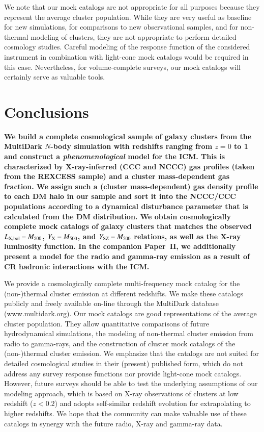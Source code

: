 \documentclass[useAMS,usenatbib]{mn2e}
\begin{document}
{We note that our mock catalogs are not appropriate for all purposes because they
represent the average cluster population. While they are very useful as baseline
for new simulations, for comparisons to new observational samples, and for
non-thermal modeling of clusters, they are not appropriate to perform detailed
cosmology studies. Careful modeling of the response function of the considered
instrument in combination with light-cone mock catalogs would be required in this
case. Nevertheless, for volume-complete surveys, our mock catalogs will
certainly serve as valuable tools.  }


\section{Conclusions}
\label{sec:7}

{\bf We build a complete cosmological sample of galaxy clusters from the
  MultiDark $N$-body simulation with redshifts ranging from $z = 0$ to 1 and
  construct a \emph{phenomenological} model for the ICM. This is characterized
  by X-ray-inferred (CCC and NCCC) gas profiles (taken from the REXCESS sample)
  and a cluster mass-dependent gas fraction. We assign such a (cluster
  mass-dependent) gas density profile to each DM halo in our sample and sort it
  into the NCCC/CCC populations according to a dynamical disturbance parameter
  that is calculated from the DM distribution.  We obtain cosmologically
  complete mock catalogs of galaxy clusters that matches the observed
  $L_{{\mathrm{X, bol}}}-M_{500}$, $Y_{{\mathrm{X}}}-M_{500}$, and $Y_{{\mathrm{SZ}}}-M_{500}$
  relations, as well as the X-ray luminosity function.  In the companion
  Paper~II, we additionally present a model for the radio and gamma-ray emission
  as a result of CR hadronic interactions with the ICM.

  We provide a cosmologically complete multi-frequency mock catalog for the
  (non-)thermal cluster emission at different redshifts. We make these catalogs
  publicly and freely available on-line through the MultiDark database
  (www.multidark.org). Our mock catalogs are good representations of the average
  cluster population. They allow quantitative comparisons of future
  hydrodynamical simulations, the modeling of non-thermal cluster emission from
  radio to gamma-rays, and the construction of cluster mock catalogs of the
  (non-)thermal cluster emission. We emphasize that the catalogs are not suited
  for detailed cosmological studies in their (present) published form, which do
  not address any survey response functions nor provide light-cone mock
  catalogs. However, future surveys should be able to test the underlying assumptions
  of our modeling approach, which is based on X-ray observations of clusters at
  low redshift ($z<0.2$) and adopts self-similar redshift evolution for
  extrapolating to higher redshifts. We hope that the community can make
  valuable use of these catalogs in synergy with the future radio, X-ray and
  gamma-ray data.}
\end{document}
